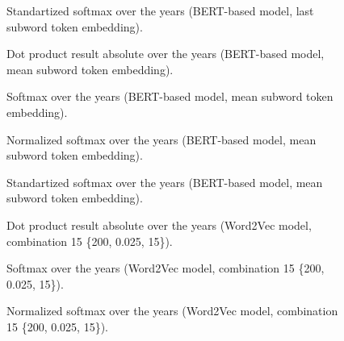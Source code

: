 \documentclass[10pt,letterpaper]{article}
\begin{document}
\begin{figure}[!ht]
    \centering
    \caption{Standartized softmax over the years (BERT-based model, last subword token embedding).}
    \label{fig:softmax_standartization_last_subword}
\end{figure}

\begin{figure}[!ht]
    \centering
    \caption{Dot product result absolute over the years (BERT-based model, mean subword token embedding).}
    \label{fig:dp_absolute_mean_subword}
\end{figure}

\begin{figure}[!ht]
    \centering
    \caption{Softmax over the years (BERT-based model, mean subword token embedding).}
    \label{fig:softmax_mean_subword}
\end{figure}

\begin{figure}[!ht]
    \centering
    \caption{Normalized softmax over the years (BERT-based model, mean subword token embedding).}
    \label{fig:softmax_normalization_mean_subword}
\end{figure}

\begin{figure}[!ht]
    \centering
    \caption{Standartized softmax over the years (BERT-based model, mean subword token embedding).}
    \label{fig:softmax_standartization_mean_subword}
\end{figure}

\begin{figure}[!ht]
    \centering
    \caption{Dot product result absolute over the years (Word2Vec model, combination 15 \{200, 0.025, 15\}).}
    \label{fig:dp_absolute_w2v_comb15}
\end{figure}

\begin{figure}[!ht]
    \centering
    \caption{Softmax over the years (Word2Vec model, combination 15 \{200, 0.025, 15\}).}
    \label{fig:softmax_w2v_comb15}
\end{figure}

\begin{figure}[!ht]
    \centering
    \caption{Normalized softmax over the years (Word2Vec model, combination 15 \{200, 0.025, 15\}).}
    \label{fig:softmax_normalization_w2v_comb15}
\end{figure}
\end{document}
